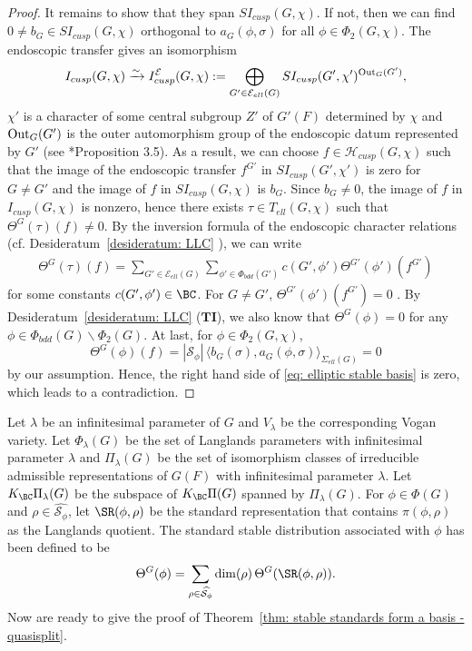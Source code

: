 \documentclass[11pt,letterpaper]{amsart}
\numberwithin{equation}{section}
\begin{document}
\begin{proof}
It remains to show that they span $SI_{cusp}(G, \chi)$. If not, then we can find $0 \neq b_{G} \in SI_{cusp}(G, \chi)$ orthogonal to $a_{G}(\phi, \sigma)$ for all $\phi \in \Phi_2(G, \chi)$. The endoscopic transfer gives an isomorphism
\[
I_{cusp}(G, \chi) \xrightarrow{\sim} I^{\mathcal{E}}_{cusp}(G, \chi) := \bigoplus_{G' \in \mathcal{E}_{ell}(G)} SI_{cusp}(G', \chi')^{{\rm Out}_G(G')},
\] 
$\chi'$ is a character of some central subgroup $Z'$ of $G'(F)$ determined by $\chi$ and ${\rm Out}_G(G')$ is the outer automorphism group of the endoscopic datum represented by $G'$ (see \cite{Art96}*{Proposition 3.5}). As a result, we can choose $f \in \mathcal{H}_{cusp}(G, \chi)$ such that the image of the endoscopic transfer $f^{G'}$ in $SI_{cusp}(G', \chi')$ is zero for $G \neq G'$ and the image of $f$ in $SI_{cusp}(G, \chi)$ is $b_{G}$. Since $b_G \neq 0$, the image of $f$ in $I_{cusp}(G, \chi)$ is nonzero, hence there exists $\tau \in T_{ell}(G, \chi)$ such that $\Theta^{G}(\tau)(f) \neq 0$. By the inversion formula of the endoscopic character relations (cf. Desideratum~\ref{desideratum: LLC} \ECR), we can write 
\begin{align}
\label{eq: elliptic stable basis}
\Theta^{G}(\tau)(f) = \sum_{G' \in \mathcal{E}_{ell}(G)} \sum_{\phi' \in \Phi_{bdd}(G')} c(G', \phi') \Theta^{G'}(\phi')(f^{G'})
\end{align}
for some constants $c(G', \phi') \in \BC$. For $G \neq G'$, $\Theta^{G'}(\phi')(f^{G'}) = 0$ . By Desideratum~\ref{desideratum: LLC} ($\mathbf{TI}$), we also know that $\Theta^G(\phi) =0$ for any $\phi \in \Phi_{bdd}(G) \backslash \Phi_2(G)$. At last, for $\phi \in \Phi_2(G, \chi)$, 
\[
\Theta^{G}(\phi)(f) = |\mathcal{S}_{\phi}| \, \langle b_G(\sigma), a_{G}(\phi, \sigma)\rangle_{\Sigma_{ell}(G)} = 0
\]
by our assumption. Hence, the right hand side of \eqref{eq: elliptic stable basis} is zero, which leads to a contradiction.
\end{proof}



Let $\lambda$ be an infinitesimal parameter of $G$ and $V_{\lambda}$ be the corresponding Vogan variety. Let $\Phi_{\lambda}(G)$ be the set of Langlands parameters with infinitesimal parameter $\lambda$ and $\Pi_{\lambda}(G)$ be the set of isomorphism classes of irreducible admissible representations of $G(F)$ with infinitesimal parameter $\lambda$. Let $K_{\BC}\Pi_{\lambda}(G)$ be the subspace of $K_{\BC}\Pi(G)$ spanned by $\Pi_{\lambda}(G)$. For $\phi \in \Phi(G)$ and $\rho \in \widehat{\mathcal{S}_{\phi}}$, let $\SR(\phi, \rho)$ be the standard representation that contains $\pi(\phi, \rho)$ as the Langlands quotient. The standard stable distribution associated with $\phi$ has been defined to be
\[
\Theta^{G}(\phi) = \sum_{\rho \in \widehat{\mathcal{S}_{\phi}}} {\rm dim}(\rho) \, \Theta^{G}(\SR(\phi, \rho)).
\]
Now are ready to give the proof of Theorem~\ref{thm: stable standards form a basis - quasisplit}.
\end{document}
